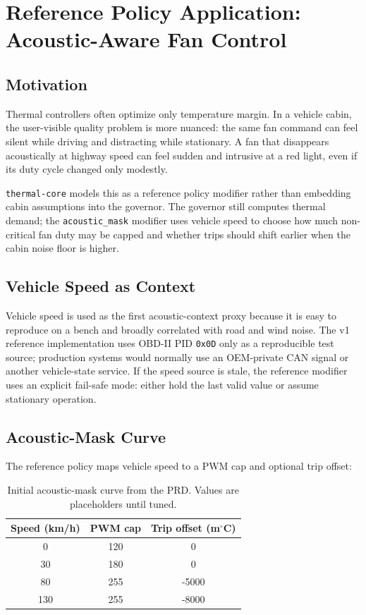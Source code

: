 \section{Reference Policy Application: Acoustic-Aware Fan Control}\label{sec:reference-policy}

\subsection{Motivation}

Thermal controllers often optimize only temperature margin. In a vehicle cabin, the user-visible quality problem is more nuanced: the same fan command can feel silent while driving and distracting while stationary. A fan that disappears acoustically at highway speed can feel sudden and intrusive at a red light, even if its duty cycle changed only modestly.

\texttt{thermal-core} models this as a reference policy modifier rather than embedding cabin assumptions into the governor. The governor still computes thermal demand; the \texttt{acoustic\_mask} modifier uses vehicle speed to choose how much non-critical fan duty may be capped and whether trips should shift earlier when the cabin noise floor is higher.

\subsection{Vehicle Speed as Context}

Vehicle speed is used as the first acoustic-context proxy because it is easy to reproduce on a bench and broadly correlated with road and wind noise. The v1 reference implementation uses OBD-II PID \texttt{0x0D} only as a reproducible test source; production systems would normally use an OEM-private CAN signal or another vehicle-state service. If the speed source is stale, the reference modifier uses an explicit fail-safe mode: either hold the last valid value or assume stationary operation.

\subsection{Acoustic-Mask Curve}

The reference policy maps vehicle speed to a PWM cap and optional trip offset:

\begin{table}[h]
\centering
\begin{tabular}{ccc}
\toprule
\textbf{Speed (km/h)} & \textbf{PWM cap} & \textbf{Trip offset (m$^\circ$C)} \\
\midrule
0 & 120 & 0 \\
30 & 180 & 0 \\
80 & 255 & -5000 \\
130 & 255 & -8000 \\
\bottomrule
\end{tabular}
\caption{Initial acoustic-mask curve from the PRD. Values are placeholders until tuned.}
\label{tab:acoustic-mask-curve}
\end{table}

